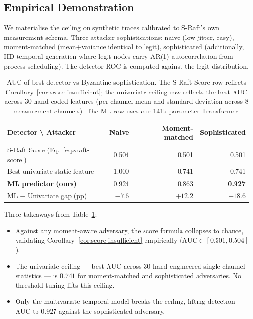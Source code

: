 \subsection{Empirical Demonstration}
\label{sec:empirical-ceiling}

We materialise the ceiling on synthetic traces calibrated to S-Raft's
own measurement schema. Three attacker sophistications:
\textsf{naive} (low jitter, easy), \textsf{moment-matched} (mean+variance
identical to legit), \textsf{sophisticated} (additionally, IID temporal
generation where legit nodes carry AR(1) autocorrelation from process
scheduling). The detector ROC is computed against the legit distribution.

\begin{table}[h]
\centering
\caption{AUC of best detector vs Byzantine sophistication. The
S-Raft Score row reflects Corollary~\ref{cor:score-insufficient}; the
univariate ceiling row reflects the best AUC across $30$ hand-coded
features (per-channel mean and standard deviation across 8 measurement
channels). The ML row uses our 141k-parameter Transformer.}
\label{tab:ceiling-emp}
\begin{tabular}{lrrr}
\toprule
Detector \textbackslash{} Attacker & Naive & Moment-matched & Sophisticated \\
\midrule
S-Raft Score (Eq.~\ref{eq:sraft-score}) & 0.504 & 0.501 & 0.501 \\
Best univariate static feature          & 1.000 & 0.741 & 0.741 \\
\textbf{ML predictor (ours)}            & 0.924 & 0.863 & \textbf{0.927} \\
\midrule
ML $-$ Univariate gap (pp)               & $-7.6$ & $+12.2$ & $+18.6$ \\
\bottomrule
\end{tabular}
\end{table}

\noindent
Three takeaways from Table~\ref{tab:ceiling-emp}:

\begin{itemize}\setlength\itemsep{1pt}
\item Against any moment-aware adversary, the score formula collapses
to chance, validating Corollary~\ref{cor:score-insufficient} empirically
($\mathrm{AUC}\in[0.501,0.504]$).
\item The univariate ceiling --- best AUC across $30$ hand-engineered
single-channel statistics --- is $0.741$ for moment-matched and
sophisticated adversaries. No threshold tuning lifts this ceiling.
\item Only the multivariate temporal model breaks the ceiling, lifting
detection AUC to $0.927$ against the sophisticated adversary.
\end{itemize}


